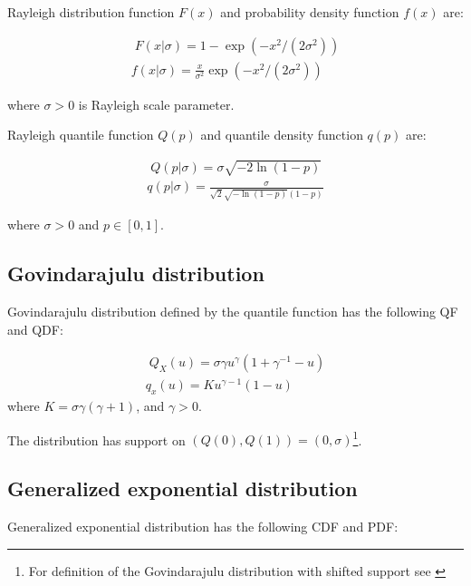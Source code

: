 \documentclass[
  12pt,
]{article}
\begin{document}
Rayleigh distribution function \(F(x)\) and probability density function \(f(x)\) are:

\[ 
\begin{gathered}\;
F(x|\sigma) = 1-\exp(-x^2/(2\sigma^2)) \\ 
f(x|\sigma) = \frac{x}{\sigma^2}\exp(-x^2/(2\sigma^2))
\end{gathered}
\]

where \(\sigma>0\) is Rayleigh scale parameter.

Rayleigh quantile function \(Q(p)\) and quantile density function \(q(p)\) are:

\[
\begin{gathered}\;
Q(p|\sigma)=\sigma\sqrt{-2\ln(1-p)} \\ 
q(p|\sigma)=\frac{\sigma}{\sqrt{2}\sqrt{-\ln(1-p)}(1-p)}
\end{gathered}
\]

where \(\sigma>0\) and \(p \in [0,1]\).

\hypertarget{govindarajulu-distribution}{%
\subsection*{Govindarajulu distribution}\label{govindarajulu-distribution}}

Govindarajulu distribution defined by the quantile function has the following QF and QDF:

\[
\begin{gathered}\;
Q_X(u)=\sigma\gamma u^\gamma(1+\gamma^{-1}-u)\\
q_x(u)=Ku^{\gamma-1}(1-u)
\end{gathered}
\]
where \(K=\sigma\gamma(\gamma+1)\), and \(\gamma>0\).

The distribution has support on \((Q(0), Q(1))=(0, \sigma)\)\footnote{For definition of the Govindarajulu distribution with shifted support see \citet{nair2012GovindarajuluDistributionProperties}}.

\hypertarget{generalized-exponential-distribution}{%
\subsection*{Generalized exponential distribution}\label{generalized-exponential-distribution}}

Generalized exponential distribution has the following CDF and PDF:
\end{document}
